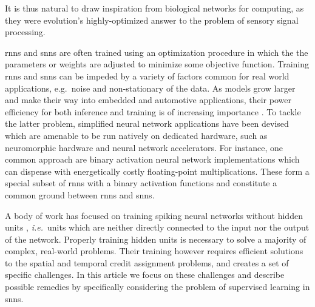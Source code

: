 \documentclass[journal,onecolumn,11pt]{IEEEtran}
\begin{document}
It is thus natural to draw inspiration from biological networks for computing, as they were evolution's highly-optimized answer to the problem of sensory signal processing. 

\Glspl{rnn} and \Glspl{snn} are often trained using an optimization procedure in which the the parameters or weights are adjusted to minimize some objective function.
Training \Glspl{rnn} and \Glspl{snn} can be impeded by a variety of factors common for real world applications, e.g.\ noise and non-stationary of the data. 
As models grow larger and make their way into embedded and automotive applications, their power efficiency for both inference and training is of increasing importance \cite{boahen_neuromorphs_2017}. 
To tackle the latter problem, simplified neural network applications have been devised which are amenable to be run natively on dedicated hardware, such as neuromorphic hardware and neural network accelerators.  
For instance, one common approach are binary activation neural network implementations which can dispense with energetically costly floating-point multiplications. %
These form a special subset of \glspl{rnn} with a binary activation functions and constitute a common ground between \Glspl{rnn} and \Glspl{snn}. 

A body of work has focused on training spiking neural networks without hidden units \cite{ponulak_supervised_2009, Gutig_Sompolinsky06_tempneur,
florian_chronotron:_2012, mohemmed_span:_2012, memmesheimer_learning_2014, Anwani_Rajendran15_normappr}, \emph{i.e.}\ units which are neither directly connected to the input nor the output of the network.  
Properly training hidden units is necessary to solve a majority of complex, real-world problems.
Their training however requires efficient solutions to the spatial and temporal credit assignment problems, and creates a set of specific challenges.  
In this article we focus on these challenges and describe possible remedies by specifically considering the problem of supervised learning in \glspl{snn}.
\end{document}
